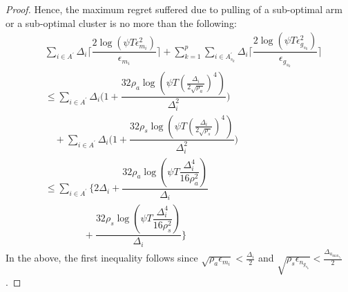 \begin{proof}
Hence, the maximum regret suffered due to pulling of a sub-optimal arm or a sub-optimal cluster is no more than the following:
 \begin{align*}
 &\sum_{i\in A^{'}}\Delta_{i}\bigg\lceil\dfrac{2\log{(\psi T\epsilon_{m_{i}}^{2})}}{\epsilon_{m_{i}}}\bigg\rceil 
\!+\! \sum_{k=1}^{p}\sum_{i\in A_{s_{k}}^{'}}\Delta_{i}\bigg\lceil\dfrac{2\log{(\psi T\epsilon_{g_{s_{k}}}^{2})}}{\epsilon_{g_{s_{k}}}}\bigg\rceil \\
&\leq\sum_{i\in A^{'}}\Delta_{i}\bigg(1+\dfrac{32\rho_{a}\log{\left(\psi T\left(\frac{\Delta_{i}}{2\sqrt{\rho_{a}}}\right)^{4}\right)}}{\Delta_{i}^{2}}\bigg) \\
&\quad+ \sum_{i\in A^{'}}\Delta_{i}\bigg(1+\dfrac{32\rho_{s}\log{\left(\psi T\left(\frac{\Delta_{i}}{2\sqrt{\rho_{s}}}\right)^{4}\right)}}{\Delta_{i}^{2}}\bigg)
\\
 &\leq \sum_{i\in A^{'}}\bigg\lbrace 2\Delta_{i}+\dfrac{32\rho_{a}\log{(\psi T\dfrac{\Delta_{i}^{4}}{16\rho_{a}^{2}})}}{\Delta_{i}} \\
& \qquad \qquad +\dfrac{32\rho_{s}\log{(\psi T\dfrac{\Delta_{i}^{4}}{16\rho_{s}^{2}})}}{\Delta_{i}}\bigg\rbrace 
 \end{align*}
In the above, the first inequality follows since $\sqrt{\rho_{a}\epsilon_{m_{i}}} < \frac{\Delta_{i}}{2}$ and $\sqrt{\rho_{s}\epsilon_{n_{g_{s_{k}}}}} < \frac{\Delta_{a_{\max_{s_{k}}}}}{2}$.

 

\end{proof}
